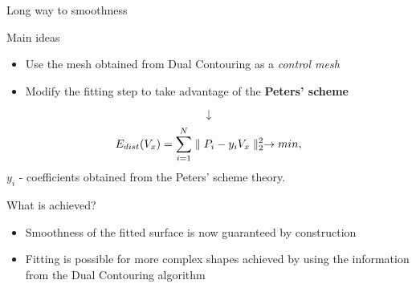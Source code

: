 \begin{frame}{Long way to smoothness}
\begin{block}{Main ideas}
\begin{itemize}
\item Use the mesh obtained from Dual Contouring as a \textit{control mesh}
\item Modify the fitting step to take advantage of the \textbf{Peters' scheme}
\end{itemize}
\end{block}
$$\downarrow$$
\begin{equation*}
E_{dist}(V_{x}) = \sum_{i=1}^{N}\norm{P_{i} - y_{i}V_{x}}^{2} \rightarrow min,
\end{equation*}
$y_{i}$ - coefficients obtained from the Peters' scheme theory.
\begin{block}{What is achieved?}
\begin{itemize}
\item Smoothness of the fitted surface is now guaranteed by construction
\item Fitting is possible for more complex shapes achieved by using the information from the Dual Contouring algorithm
\end{itemize}
\end{block}
\end{frame}
